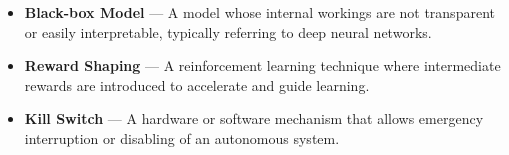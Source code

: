 \begin{itemize}
            \item \textbf{Black-box Model} — A model whose internal workings are not transparent or easily interpretable, typically referring to deep neural networks.

            \item \textbf{Reward Shaping} — A reinforcement learning technique where intermediate rewards are introduced to accelerate and guide learning.

            \item \textbf{Kill Switch} — A hardware or software mechanism that allows emergency interruption or disabling of an autonomous system.
        \end{itemize}